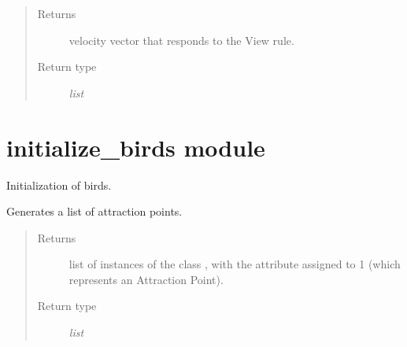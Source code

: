 \documentclass[a4paper,11pt,oneside,english]{sphinxmanual}
\begin{document}
\begin{fulllineitems}
\begin{fulllineitems}
\begin{quote}
\begin{description}
\item[{Returns}] \leavevmode
velocity vector that responds to the View rule.

\item[{Return type}] \leavevmode
\textit{list}

\end{description}\end{quote}

\bigskip 
\bigskip 

\end{fulllineitems}


\end{fulllineitems}



\chapter{initialize\_birds module}
\label{\detokenize{initialize_birds:module-initialize_birds}}\label{\detokenize{initialize_birds:initialize-birds-module}}\label{\detokenize{initialize_birds::doc}}\label{\detokenize{initialize_birds:module-0}}
Initialization of birds.

\bigskip 
\bigskip 


\begin{fulllineitems}
\label{\detokenize{initialize_birds:initialize_birds.generateAttractionPoints}}
Generates a list of attraction points.
\begin{quote}\begin{description}
\item[{Returns}] \leavevmode
list of instances of the class {\hyperref[\detokenize{bird:bird.Bird}]{}}, with the attribute  assigned to \sphinxhyphen{}1 (which represents an Attraction Point).

\item[{Return type}] \leavevmode
\textit{list}

\end{description}\end{quote}

\bigskip 
\bigskip 

\end{fulllineitems}
\end{document}
